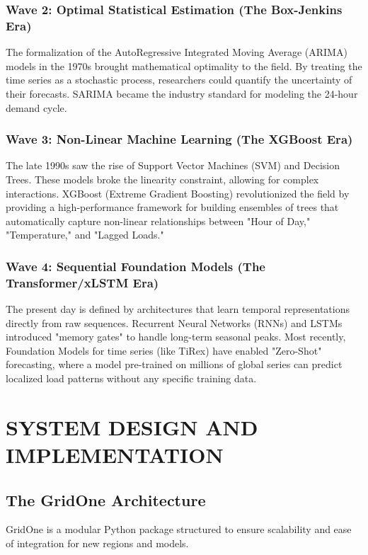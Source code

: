 \documentclass[12pt,a4paper,twoside,fleqn]{report}
\begin{document}
\subsection{Wave 2: Optimal Statistical Estimation (The Box-Jenkins Era)}
The formalization of the AutoRegressive Integrated Moving Average (ARIMA) models in the 1970s brought mathematical optimality to the field. By treating the time series as a stochastic process, researchers could quantify the uncertainty of their forecasts. SARIMA became the industry standard for modeling the 24-hour demand cycle.

\subsection{Wave 3: Non-Linear Machine Learning (The XGBoost Era)}
The late 1990s saw the rise of Support Vector Machines (SVM) and Decision Trees. These models broke the linearity constraint, allowing for complex interactions. XGBoost (Extreme Gradient Boosting) revolutionized the field by providing a high-performance framework for building ensembles of trees that automatically capture non-linear relationships between "Hour of Day," "Temperature," and "Lagged Loads."

\subsection{Wave 4: Sequential Foundation Models (The Transformer/xLSTM Era)}
The present day is defined by architectures that learn temporal representations directly from raw sequences. Recurrent Neural Networks (RNNs) and LSTMs introduced "memory gates" to handle long-term seasonal peaks. Most recently, Foundation Models for time series (like TiRex) have enabled "Zero-Shot" forecasting, where a model pre-trained on millions of global series can predict localized load patterns without any specific training data.

\chapter{SYSTEM DESIGN AND IMPLEMENTATION}
\section{The GridOne Architecture}
GridOne is a modular Python package structured to ensure scalability and ease of integration for new regions and models.
\end{document}
